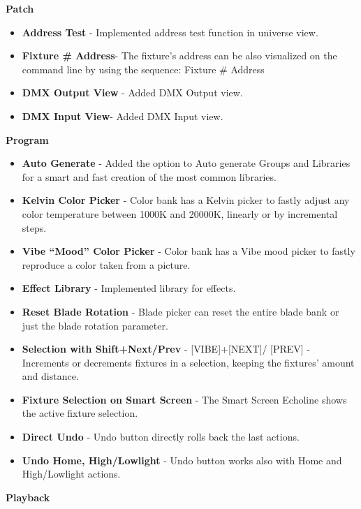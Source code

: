 \documentclass[
]{article}
\begin{document}
\textbf{Patch}

\begin{itemize}
\item
  \textbf{Address Test} - Implemented address test function in universe view.
\item
  \textbf{Fixture \# Address}- The fixture's address can be also visualized on the command line by using the sequence: Fixture \# Address
\item
  \textbf{DMX Output View} - Added DMX Output view.
\item
  \textbf{DMX Input View}- Added DMX Input view.
\end{itemize}

\textbf{Program}

\begin{itemize}
\item
  \textbf{Auto Generate} - Added the option to Auto generate Groups and Libraries for a smart and fast creation of the most common libraries.
\item
  \textbf{Kelvin Color Picker} - Color bank has a Kelvin picker to fastly adjust any color temperature between 1000K and 20000K, linearly or by incremental steps.
\item
  \textbf{Vibe ``Mood'' Color Picker} - Color bank has a Vibe mood picker to fastly reproduce a color taken from a picture.
\item
  \textbf{Effect Library} - Implemented library for effects.
\item
  \textbf{Reset Blade Rotation} - Blade picker can reset the entire blade bank or just the blade rotation parameter.
\item
  \textbf{Selection with Shift+Next/Prev} - {[}VIBE{]}+{[}NEXT{]}/ {[}PREV{]} - Increments or decrements fixtures in a selection, keeping the fixtures' amount and distance.
\item
  \textbf{Fixture Selection on Smart Screen} - The Smart Screen Echoline shows the active fixture selection.
\item
  \textbf{Direct Undo} - Undo button directly rolls back the last actions.
\item
  \textbf{Undo Home, High/Lowlight} - Undo button works also with Home and High/Lowlight actions.
\end{itemize}

\textbf{Playback}
\end{document}
